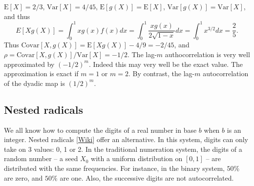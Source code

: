 \documentclass[oneside,10pt]{book}
\begin{document}
$\text{E}[X] = 2/3$, $\text{Var}[X] = 4/45$, $\text{E}[g(X)] = \text{E}[X]$, $\text{Var}[g(X)] = \text{Var}[X]$, and thus
$$
E[X g(X)] =\int_0^1 x g(x)f(x)dx = \int_0^1 \frac{xg(x)}{2\sqrt{1-x}}dx=  \int_0^1 x^{3/2}dx = \frac{2}{5}.
$$
Thus $\text{Covar}[X, g(X)] = \text{E}[X g(X)] - 4/9 = -2/45$, and  
$\rho=\text{Covar}[X, g(X)] / \text{Var}[X] = -1/2$. The lag-$m$ authocorrelation 
 is very well approximated by $(-1/2)^m$. Indeed this may very well be the exact value. The approximation is exact if $m=1$ or $m=2$.
 By contrast, the lag-$m$ autocorrelation of the \textcolor{index}{dyadic map} is $(1/2)^m$.



\subsection{Nested radicals}\label{prasoil}

We all know how to compute the digits of a real number in base $b$ when $b$ is an integer. 
\textcolor{index}{Nested radicals} [\href{https://en.wikipedia.org/wiki/Nested_radical}{Wiki}]  
offer an alternative. In this system, digits can only take on  3 values: 0, 1 or 2. In the traditional numeration system, the 
 digits of a random number -- a seed $X_0$ with a uniform distribution on $[0, 1]$ -- are distributed with the same frequencies. For instance, in the binary system, $50\%$ are zero, and $50\%$ are one. Also, the successive digits are not autocorrelated. 
\end{document}
